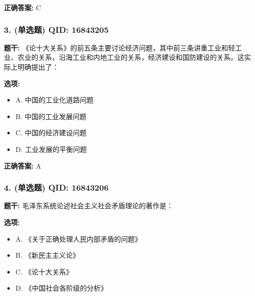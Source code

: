 \documentclass[12pt,UTF8]{ctexart}
\begin{document}
\textbf{正确答案:}
C

\vspace{0.3em}\hrulefill\vspace{0.7em}

\subsubsection*{3. (单选题) \small QID: 16843205}

\textbf{题干:}
《论十大关系》的前五条主要讨论经济问题，其中前三条讲重工业和轻工业、农业的关系，沿海工业和内地工业的关系，经济建设和国防建设的关系。这实际上明确提出了：

\textbf{选项:}
\begin{itemize}[leftmargin=*]

  \item A. 中国的工业化道路问题

  \item B. 中国的工业发展问题

  \item C. 中国的经济建设问题

  \item D. 工业发展的平衡问题

\end{itemize}

\textbf{正确答案:}
A

\vspace{0.3em}\hrulefill\vspace{0.7em}

\subsubsection*{4. (单选题) \small QID: 16843206}

\textbf{题干:}
毛泽东系统论述社会主义社会矛盾理论的著作是：

\textbf{选项:}
\begin{itemize}[leftmargin=*]

  \item A. 《关于正确处理人民内部矛盾的问题》

  \item B. 《新民主主义论》

  \item C. 《论十大关系》

  \item D. 《中国社会各阶级的分析》

\end{itemize}
\end{document}
